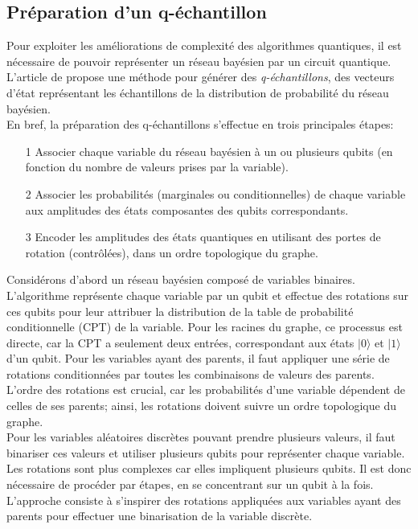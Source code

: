 \subsection{Préparation d'un q-échantillon}
\label{prepQE}
Pour exploiter les améliorations de complexité des algorithmes quantiques, il est nécessaire de pouvoir représenter un réseau bayésien par un circuit quantique. L'article de \cite{quant_rep_BN} propose une méthode pour générer des \textit{q-échantillons}, des vecteurs d'état représentant les échantillons de la distribution de probabilité du réseau bayésien.
\\
En bref, la préparation des q-échantillons s'effectue en trois principales étapes:
\begin{itemize}
    \item[1] Associer chaque variable du réseau bayésien à un ou plusieurs qubits (en fonction du nombre de valeurs prises par la variable).
    \item[2] Associer les probabilités (marginales ou conditionnelles) de chaque variable aux amplitudes des états composantes des qubits correspondants.
    \item[3] Encoder les amplitudes des états quantiques en utilisant des portes de rotation (contrôlées), dans un ordre topologique du graphe.
\end{itemize}
\noindent
Considérons d'abord un réseau bayésien composé de variables binaires. L'algorithme représente chaque variable par un qubit et effectue des rotations sur ces qubits pour leur attribuer la distribution de la table de probabilité conditionnelle (CPT) de la variable. Pour les racines du graphe, ce processus est directe, car la CPT a seulement deux entrées, correspondant aux états $|0\rangle$ et $|1\rangle$ d'un qubit. Pour les variables ayant des parents, il faut appliquer une série de rotations conditionnées par toutes les combinaisons de valeurs des parents. L'ordre des rotations est crucial, car les probabilités d'une variable dépendent de celles de ses parents; ainsi, les rotations doivent suivre un ordre topologique du graphe. 
\\
Pour les variables aléatoires discrètes pouvant prendre plusieurs valeurs, il faut binariser ces valeurs et utiliser plusieurs qubits pour représenter chaque variable. Les rotations sont plus complexes car elles impliquent plusieurs qubits. Il est donc nécessaire de procéder par étapes, en se concentrant sur un qubit à la fois. L'approche consiste à s'inspirer des rotations appliquées aux variables ayant des parents pour effectuer une binarisation de la variable discrète.
